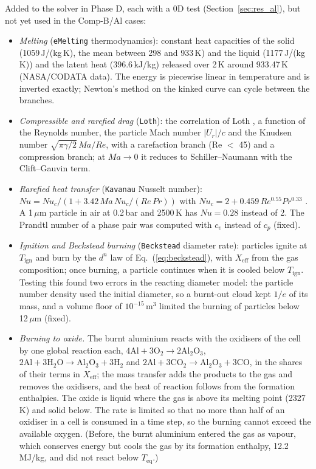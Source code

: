 \documentclass{article}
\begin{document}
Added to the solver in Phase D, each with a 0D test (Section~\ref{sec:res_al}), but not yet used in the Comp-B/Al cases:
\begin{itemize}
    \item \emph{Melting} (\texttt{eMelting} thermodynamics): constant heat capacities of the solid (1059\,J/(kg\,K), the mean between 298 and 933\,K) and the liquid (1177\,J/(kg\,K)) and the latent heat (396.6\,kJ/kg) released over 2\,K around 933.47\,K (NASA/CODATA data). The energy is piecewise linear in temperature and is inverted exactly; Newton's method on the kinked curve can cycle between the branches.
    \item \emph{Compressible and rarefied drag} (\texttt{Loth}): the correlation of Loth \cite{loth}, a function of the Reynolds number, the particle Mach number $|U_r|/c$ and the Knudsen number $\sqrt{\pi\gamma/2}\,Ma/Re$, with a rarefaction branch (Re $<$ 45) and a compression branch; at $Ma \to 0$ it reduces to Schiller--Naumann with the Clift--Gauvin term.
    \item \emph{Rarefied heat transfer} (\texttt{Kavanau} Nusselt number): $Nu = Nu_c/(1 + 3.42\,Ma\,Nu_c/(Re\,Pr))$ with $Nu_c = 2 + 0.459\,Re^{0.55}Pr^{0.33}$ \cite{kavanau}. A 1\,$\mu$m particle in air at 0.2\,bar and 2500\,K has $Nu = 0.28$ instead of 2. The Prandtl number of a phase pair was computed with $c_v$ instead of $c_p$ (fixed).
    \item \emph{Ignition and Beckstead burning} (\texttt{Beckstead} diameter rate): particles ignite at $T_\text{ign}$ and burn by the $d^n$ law of Eq.~(\ref{eq:beckstead}), with $X_\text{eff}$ from the gas composition; once burning, a particle continues when it is cooled below $T_\text{ign}$. Testing this found two errors in the reacting diameter model: the particle number density used the initial diameter, so a burnt-out cloud kept $1/e$ of its mass, and a volume floor of $10^{-15}\,\text{m}^3$ limited the burning of particles below 12\,$\mu$m (fixed).
    \item \emph{Burning to oxide.} The burnt aluminium reacts with the oxidisers of the cell by one global reaction each, $4\text{Al} + 3\text{O}_2 \to 2\text{Al}_2\text{O}_3$, $2\text{Al} + 3\text{H}_2\text{O} \to \text{Al}_2\text{O}_3 + 3\text{H}_2$ and $2\text{Al} + 3\text{CO}_2 \to \text{Al}_2\text{O}_3 + 3\text{CO}$, in the shares of their terms in $X_\text{eff}$; the mass transfer adds the products to the gas and removes the oxidisers, and the heat of reaction follows from the formation enthalpies. The oxide is liquid where the gas is above its melting point (2327\,K) and solid below. The rate is limited so that no more than half of an oxidiser in a cell is consumed in a time step, so the burning cannot exceed the available oxygen. (Before, the burnt aluminium entered the gas as vapour, which conserves energy but cools the gas by its formation enthalpy, 12.2\,MJ/kg, and did not react below $T_\text{eq}$.)

\end{itemize}
\end{document}
